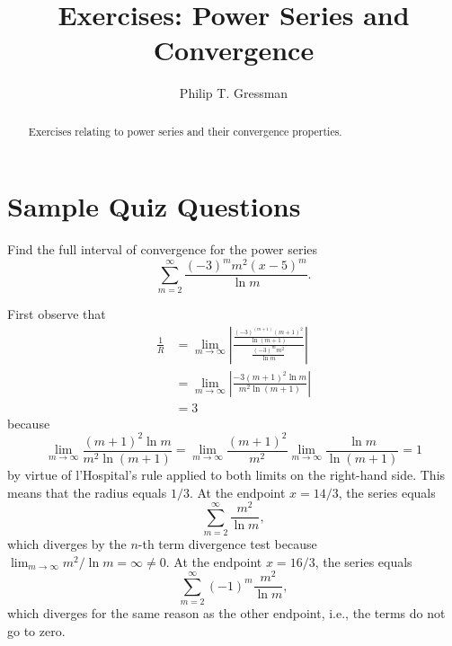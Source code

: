\documentclass{ximera}
\title{Exercises: Power Series and Convergence}
\author{Philip T. Gressman}
\begin{document}
\begin{abstract}
Exercises relating to power series and their convergence properties.
\end{abstract}
\maketitle


\section*{Sample Quiz Questions}
\begin{question}%

Find the full interval of convergence for the power series \[\sum_{m=2}^{\infty} \frac{(-3)^mm^2(x - 5)^m }{\ln m}.\]
\begin{multiplechoice}
\choice{\(\displaystyle \left[\frac{14}{3},\frac{16}{3}\right)\)}
\choice{\(\displaystyle \left(2,8\right]\)}
\choice{\(\displaystyle \left[2,8\right]\)}
\choice{\(\displaystyle \left(-\infty,\infty\right)\)}
\end{multiplechoice}
\begin{feedback}
First observe that 
\[\begin{aligned}
\frac{1}{R} & = \lim_{m\rightarrow \infty} \left| \frac{\frac{(-3)^{(m+1)}{(m+1)}^2 }{\ln {(m+1)}} }{\frac{(-3)^mm^2 }{\ln m}} \right| \\
& = \lim_{m\rightarrow \infty} \left| \frac{-3{(m+1)}^2\ln m }{m^2\ln {(m+1)} } \right| \\
& = 3
\end{aligned}\]
because \[\lim_{m \rightarrow \infty} \frac{(m+1)^2 \ln m}{m^2 \ln (m+1)} = \lim_{m \rightarrow \infty} \frac{(m+1)^2}{m^2} \lim_{m \rightarrow \infty} \frac{\ln m}{\ln (m+1)} = 1\] by virtue of l'Hospital's rule applied to both limits on the right-hand side.
This means that the radius equals \(1/3\). At the endpoint \(x=14/3\), the series equals \[\sum_{m=2}^{\infty} \frac{m^2 }{\ln m },\] which diverges by the \(n\)-th term divergence test because \(\lim_{m \rightarrow \infty} m^{2} / \ln m = \infty \neq 0\). At the endpoint \(x=16/3\), the series equals \[\sum_{m=2}^{\infty} (-1)^m\frac{m^2 }{\ln m },\] which diverges for the same reason as the other endpoint, i.e., the terms do not go to zero.
\end{feedback}

\end{question}
\end{document}
